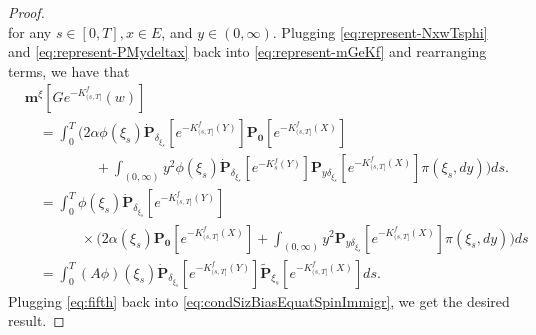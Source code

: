 \begin{proof}
\begin{equation}
\end{equation}
	for any $s\in [0,T],x\in E$, and $y\in (0,\infty)$.
	Plugging \eqref{eq:represent-NxwTsphi} and \eqref{eq:represent-PMydeltax} back into \eqref{eq:represent-mGeKf} and rearranging terms, we have that
\begin{equation}\label{eq:fifth}
\begin{split}
    &\mathbf m^\xi[Ge^{-K_{(s, T]}^f}(w)]\\
	&\quad=\int_0^T \Big(2\alpha\phi(\xi_s)\dot{\mathbf P}_{\delta_{\xi_s}}[e^{-K^f_{(s,T]}(Y)}]\mathbf P_{\mathbf 0}[e^{-K^f_{(s,T]}(X)}] \\
	&\qquad\qquad\quad + \int_{(0,\infty)}y^2\phi(\xi_s)\dot{\mathbf P}_{\delta_{\xi_s}}[e^{-K_s^f(Y)}]\mathbf P_{y\delta_{\xi_s}}[e^{-K^f_{(s,T]}(X)}]\pi(\xi_s,dy)\Big)ds.\\
	&\quad=\int_0^T \phi(\xi_s)\dot{\mathbf P}_{\delta_{\xi_s}}[e^{-K^f_{(s,T]}(Y)}] \\
	&\qquad\qquad\times\Big(2\alpha(\xi_s)\mathbf P_{\mathbf 0}[e^{-K^f_{(s,T]}(X)}] + \int_{(0,\infty)}y^2\mathbf P_{y\delta_{\xi_s}}[e^{-K^f_{(s,T]}(X)}]\pi(\xi_s,dy)\Big)ds\\
	&\quad =\int_0^T (A\phi)(\xi_s)\dot{\mathbf P}_{\delta_{\xi_s}}[e^{-K^f_{(s,T]}(Y)}]\widetilde {\mathbf P}_{\xi_s}[e^{-K^f_{(s,T]}(X)}]ds.
\end{split}\end{equation}
	Plugging \eqref{eq:fifth} back into \eqref{eq:condSizBiasEquatSpinImmigr}, we get the desired result.
\end{proof}
